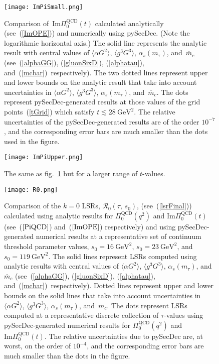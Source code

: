 \documentclass[12pt, letterpaper]{article}
\renewcommand{\Im}{\mathrm{Im}}
\newcommand{\lsr}{\mathcal{R}}
\newcommand{\vev}[1]{\ensuremath{\langle #1\rangle}}
\newcommand{\aGG}{\vev{\alpha G^2}}
\newcommand{\gggGGG}{\vev{g^3 G^3}}
\newcommand{\gev}{\ensuremath{\text{GeV}}}
\begin{document}
%
\begin{figure}[htbp]
\begin{center}
  \texttt{[image: ImPiSmall.png]}
\end{center}
\caption{\label{ImPiSmallPlot} 
  Comparison of~$\Im\Pi_0^{\text{QCD}}(t)$ calculated analytically
  (see~(\ref{ImOPE})) and numerically using pySecDec.
  (Note the logarithmic horizontal axis.)
  The solid line represents the analytic result with central values of
  $\aGG$, $\gggGGG$, $\alpha_s(m_{\tau})$, and~$\overline{m}_c$  
  (see~(\ref{alphaGG}), (\ref{gluonSixD}), (\ref{alphatau}), and~(\ref{mcbar})~respectively).
  The two dotted lines represent upper and lower bounds on the analytic result 
  that take into account uncertainties in $\aGG$, $\gggGGG$, $\alpha_s(m_{\tau})$, 
  and~$\overline{m}_c$.
  The dots represent pySecDec-generated results at those values of the grid 
  points~(\ref{tGrid}) which satisfy $t\lesssim 28\ \gev^2$.
  The relative uncertainties of the pySecDec-generated results are of the order 
  $10^{-7}$,
  and the corresponding error bars are much smaller than the dots used in the figure.
  }
\end{figure}
%

%
\begin{figure}[htbp]
\begin{center}
  \texttt{[image: ImPiUpper.png]}
\end{center}
\caption{\label{ImPiLargePlot} 
The same as fig.~\ref{ImPiSmallPlot} but for a larger range of $t$-values.}
\end{figure}
%

%
\begin{figure}[htbp]
\begin{center}
  \texttt{[image: R0.png]}
\end{center}
\caption{\label{RzeroPlot}
  Comparison of the $k=0$ LSRs, $\lsr_0(\tau,\,s_0)$, (see~(\ref{lsrFinal}))
  calculated using analytic results for $\Pi_0^{\text{QCD}}(q^2)$ and $\Im\Pi_0^{\text{QCD}}(t)$
  (see~($\ref{PiQCD}$) and~($\ref{ImOPE}$) respectively)
  and using pySecDec-generated numerical results
  at a representative set of continuum threshold parameter values,
  $s_0=16\ \gev^2$, $s_0=23\ \gev^2$, and~$s_0=119\ \gev^2$.
  The solid lines represent LSRs computed using analytic results with central values of
  $\aGG$, $\gggGGG$, $\alpha_s(m_{\tau})$, and~$\overline{m}_c$  
  (see~(\ref{alphaGG}), (\ref{gluonSixD}), (\ref{alphatau}), and~(\ref{mcbar})~respectively).
  Dotted lines represent upper and lower bounds on the solid lines 
  that take into account uncertainties in $\aGG$, $\gggGGG$, $\alpha_s(m_{\tau})$, 
  and~$\overline{m}_c$.
  The dots represent LSRs computed at a representative discrete collection of $\tau$-values 
  using pySecDec-generated numerical results for $\Pi_0^{\text{QCD}}(q^2)$ and 
  $\Im\Pi_0^{\text{QCD}}(t)$.
  The relative uncertainties due to pySecDec are, at worst, on the order of $10^{-4}$, 
  and the corresponding error bars are much smaller than the dots in the figure.}
\end{figure}
%
\end{document}
